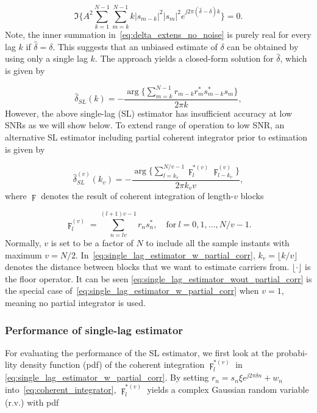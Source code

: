 \begin{equation}
  \label{eq:delta_extens_no_noise}
  \Im\bigg\{A^2\sum_{k=1}^{N-1}\sum_{m=k}^{N-1}k|s_{m-k}|^2|s_m|^2e^{j2\pi (\hat{\delta}-\delta)k}\bigg\}=0.
  \end{equation}
Note, the inner summation in~\eqref{eq:delta_extens_no_noise} is purely real for every lag $k$ if $\hat{\delta}=\delta$.
This suggests that an unbiased estimate of $\delta$ can be obtained by using only a single lag $k$. The approach yields
a closed-form solution for $\hat{\delta}$, which is given by

\begin{equation}
  \label{eq:single_lag_estimator_wout_partial_corr}
  \hat{\delta}_{SL}(k)=-\frac{\arg\big\{\sum_{m=k}^{N-1}r_{m-k}r_m^*s_{m-k}^*s_m\big\}}{2\pi k},
\end{equation}
However, the above single-lag (SL) estimator has insufficient
accuracy at low SNRs as we will show below. To extend range of operation to low SNR,
an alternative SL estimator including partial coherent integrator
prior to estimation is given by

\begin{equation}
  \label{eq:single_lag_estimator_w_partial_corr}
  \hat{\delta}_{SL}^{(v)}(k_v)=-\frac{\arg\big\{\sum_{l=k_v}^{N/v-1}\digamma_l^{*(v)}\digamma_{l-k_v}^{(v)}\big\}}{2\pi k_vv},
\end{equation}
where $\digamma$ denotes the result of coherent integration of length-$v$ blocks

\begin{equation}
  \label{eq:coherent_integrator}
  \digamma_l^{(v)}=\sum_{n=lv}^{(l+1)v-1}r_ns_n^*, \quad \text{for}~l=0,1,\ldots,N/v{-}1.
\end{equation}
Normally, $v$ is set to be a factor of $N$ to include all the sample instants with maximum $v=N/2$.
In~\eqref{eq:single_lag_estimator_w_partial_corr}, $k_v=\lfloor k/v \rfloor$ denotes
the distance between blocks that we want to estimate carriers from.
$\lfloor \cdot \rfloor$ is the floor operator. It can be seen 
\eqref{eq:single_lag_estimator_wout_partial_corr} is the special case of~\eqref{eq:single_lag_estimator_w_partial_corr}
when $v=1$, meaning no partial integrator is used.

\subsubsection{Performance of single-lag estimator}

For evaluating the performance of the SL estimator, we first look at
the probabi-lity density function (pdf) of the coherent integration
$\digamma_l^{*(v)}$ in
\eqref{eq:single_lag_estimator_w_partial_corr}.
By setting $r_n=s_n\xi e^{j2\pi \delta n}+w_n$ into~\eqref{eq:coherent_integrator},
$\digamma_{l}^{*(v)}$ yields a complex Gaussian random variable (r.v.) with pdf

